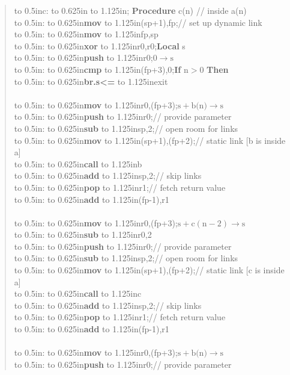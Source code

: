\documentclass[12pt,english]{book}
\newcommand*{\asmstyle}{\noindent\ttfamily\selectfont\small}
\newcommand*{\asmline}[3][]{%
\null\hbox to 0.5in{\ifx#1\empty\else{#1}:\fi\hss}%
\hbox to 0.625in{\textbf{#2}\hss}%
\hbox to 1.125in{#3\hss}}
\begin{document}
\clearpage
\begin{quote}\asmstyle
\asmline[c]{}{}; \textbf{Procedure} c(n) // inside a(n)\\
\asmline{mov}{(sp+1),fp};\qquad // set up dynamic link\\
\asmline{mov}{fp,sp}\\
\asmline{xor}{r0,r0};\qquad \textbf{Local} s\\
\asmline{push}{r0};\qquad \(0\rightarrow\text{s}\)\\
\asmline{cmp}{(fp+3),0};\qquad\textbf{If} \(\text{n}>0\) \textbf{Then}\\
\asmline{br.s<=}{exit}\\
\null\\
\asmline{mov}{r0,(fp+3)};\qquad\qquad \(\text{s}+\text{b(n)}\rightarrow\text{s}\)\\
\asmline{push}{r0};\qquad\qquad // provide parameter\\
\asmline{sub}{sp,2};\qquad\qquad // open room for links\\
\asmline{mov}{(sp+1),(fp+2)};\qquad\qquad // static link [b is inside a]\\
\asmline{call}{b}\\
\asmline{add}{sp,2};\qquad\qquad // skip links\\
\asmline{pop}{r1};\qquad\qquad // fetch return value\\
\asmline{add}{(fp-1),r1}\\
\null\\
\asmline{mov}{r0,(fp+3)};\qquad\qquad\(\text{s}+\text{c}(\text{n}-2)\rightarrow\text{s}\)\\
\asmline{sub}{r0,2}\\
\asmline{push}{r0};\qquad\qquad // provide parameter\\
\asmline{sub}{sp,2};\qquad\qquad // open room for links\\
\asmline{mov}{(sp+1),(fp+2)};\qquad\qquad // static link [c is inside a]\\\asmline{call}{c}\\
\asmline{add}{sp,2};\qquad\qquad // skip links\\
\asmline{pop}{r1};\qquad\qquad // fetch return value\\
\asmline{add}{(fp-1),r1}\\
\null\\
\asmline{mov}{r0,(fp+3)};\qquad\qquad \(\text{s}+\text{b(n)}\rightarrow\text{s}\)\\
\asmline{push}{r0};\qquad\qquad // provide parameter\\

\end{quote}
\end{document}
